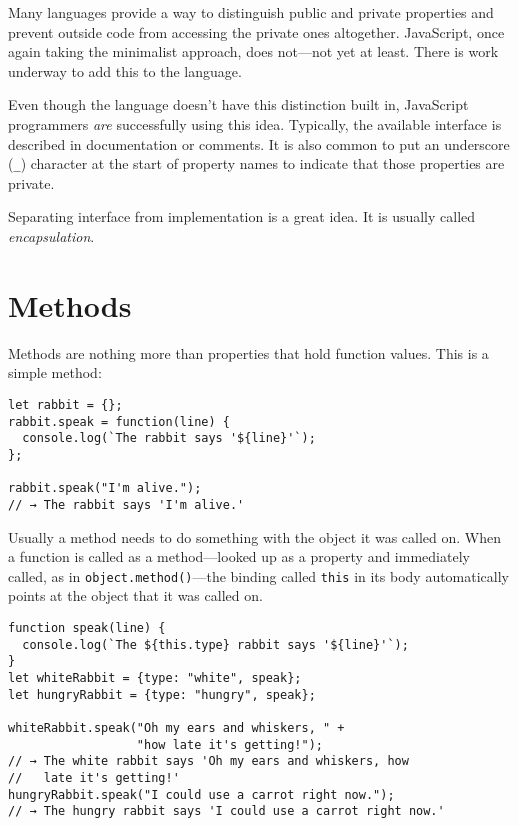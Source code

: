 Many languages provide a way to distinguish public and private properties and prevent outside code from accessing the private ones altogether. JavaScript, once again taking the minimalist approach, does not—not yet at least. There is work underway to add this to the language.

Even though the language doesn't have this distinction built in, JavaScript programmers \emph{are} successfully using this idea. Typically, the available interface is described in documentation or comments. It is also common to put an underscore (\lstinline`_`) character at the start of property names to indicate that those properties are private.

Separating interface from implementation is a great idea. It is usually called \emph{encapsulation}.

\label{object.obj_methods}\section{Methods}

Methods are nothing more than properties that hold function values. This is a simple method:

\begin{lstlisting}
let rabbit = {};
rabbit.speak = function(line) {
  console.log(`The rabbit says '${line}'`);
};

rabbit.speak("I'm alive.");
// → The rabbit says 'I'm alive.'
\end{lstlisting}
\noindent{}

Usually a method needs to do something with the object it was called on. When a function is called as a method—looked up as a property and immediately called, as in \lstinline`object.method()`—the binding called \lstinline`this` in its body automatically points at the object that it was called on.

\begin{lstlisting}
function speak(line) {
  console.log(`The ${this.type} rabbit says '${line}'`);
}
let whiteRabbit = {type: "white", speak};
let hungryRabbit = {type: "hungry", speak};

whiteRabbit.speak("Oh my ears and whiskers, " +
                  "how late it's getting!");
// → The white rabbit says 'Oh my ears and whiskers, how
//   late it's getting!'
hungryRabbit.speak("I could use a carrot right now.");
// → The hungry rabbit says 'I could use a carrot right now.'
\end{lstlisting}
\noindent{}

